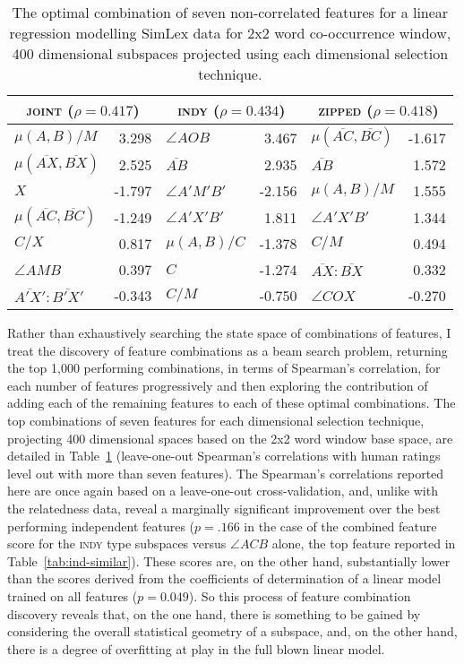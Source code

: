 \begin{table}
\centering
\begin{tabular}{lr|lr|lr}
\hline
\multicolumn{2}{c}{\textsc{joint} ($\rho = 0.417$)} & \multicolumn{2}{c}{\textsc{indy} ($\rho = 0.434$)} & \multicolumn{2}{c}{\textsc{zipped} ($\rho = 0.418$)} \\
\hline
$\mu(A,B)/M$ & 3.298 & $\angle AOB$ & 3.467 & $\mu(\overline{AC},\overline{BC})$ & -1.617 \\
$\mu(\overline{AX},\overline{BX})$ & 2.525 & $\overline{AB}$ & 2.935 & $\overline{AB}$ & 1.572 \\
$X$ & -1.797 & $\angle A'M'B'$ & -2.156 & $\mu(A,B)/M$ & 1.555 \\
$\mu(\overline{AC},\overline{BC})$ & -1.249 & $\angle A'X'B'$ & 1.811 & $\angle A'X'B'$ & 1.344 \\
$C/X$ & 0.817 & $\mu(A,B)/C$ & -1.378 & $C/M$ & 0.494 \\
$\angle AMB$ & 0.397 & $C$ & -1.274 & $\overline{AX}:\overline{BX}$ & 0.332 \\
$\overline{A'X'}:\overline{B'X'}$ & -0.343 & $C/M$ & -0.750 & $\angle COX$ & -0.270 \\
\hline
\end{tabular}
\caption[Optimal Feature Vectors for Similarity]{The optimal combination of seven non-correlated features for a linear regression modelling SimLex data for 2x2 word co-occurrence window, 400 dimensional subspaces projected using each dimensional selection technique.}
\label{tab:fivelated}
\end{table}

Rather than exhaustively searching the state space of combinations of features, I treat the discovery of feature combinations as a beam search problem, returning the top 1,000 performing combinations, in terms of Spearman's correlation, for each number of features progressively and then exploring the contribution of adding each of the remaining features to each of these optimal combinations.  The top combinations of seven features for each dimensional selection technique, projecting 400 dimensional spaces based on the 2x2 word window base space, are detailed in Table~\ref{tab:fivelated} (leave-one-out Spearman's correlations with human ratings level out with more than seven features).  The Spearman's correlations reported here are once again based on a leave-one-out cross-validation, and, unlike with the relatedness data, reveal a marginally significant improvement over the best performing independent features ($p =.166$ in the case of the combined feature score for the \textsc{indy} type subspaces versus $\angle ACB$ alone, the top feature reported in Table~\ref{tab:ind-similar}).  These scores are, on the other hand, substantially lower than the scores derived from the coefficients of determination of a linear model trained on all features ($p = 0.049$).  So this process of feature combination discovery reveals that, on the one hand, there is something to be gained by considering the overall statistical geometry of a subspace, and, on the other hand, there is a degree of overfitting at play in the full blown linear model.

